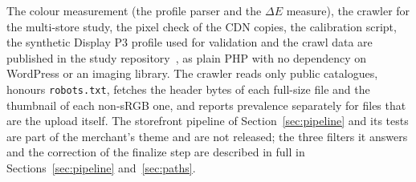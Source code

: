 \documentclass[sigconf,nonacm,screen]{acmart}
\begin{document}
The colour measurement (the profile parser and the $\Delta E$ measure), the crawler for the multi-store study, the pixel check of the CDN copies, the calibration script, the synthetic Display P3 profile used for validation and the crawl data are published in the study repository~\cite{studyrepo}, as plain PHP with no dependency on WordPress or an imaging library. The crawler reads only public catalogues, honours \texttt{robots.txt}, fetches the header bytes of each full-size file and the thumbnail of each non-sRGB one, and reports prevalence separately for files that are the upload itself. The storefront pipeline of Section~\ref{sec:pipeline} and its tests are part of the merchant's theme and are not released; the three filters it answers and the correction of the finalize step are described in full in Sections~\ref{sec:pipeline} and~\ref{sec:paths}.



\end{document}
